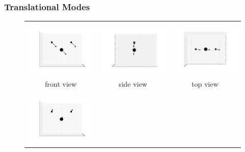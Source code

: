 \documentclass[11pt]{article}
\begin{document}
\subsubsection{Translational Modes}
\label{trans}
\begin{figure}[htp]
    \centering
    \begin{tabular}{|ccc|}\hline&&\\
    \includegraphics[width=5.5cm,clip=true,trim=3cm 2cm 3cm 2cm]{images/0-0_0.pdf}&
    \includegraphics[width=5.5cm,clip=true,trim=3cm 2cm 3cm 2cm]{images/0-90_0.pdf}&
    \includegraphics[width=5.5cm,clip=true,trim=3cm 2cm 3cm 2cm]{images/90-0_0.pdf}\\front view&side view&top view\\\hline&&\\
    \includegraphics[width=5.5cm,clip=true,trim=3cm 2cm 3cm 2cm]{images/0-0_1.pdf}&

\end{tabular}
\end{figure}
\end{document}
